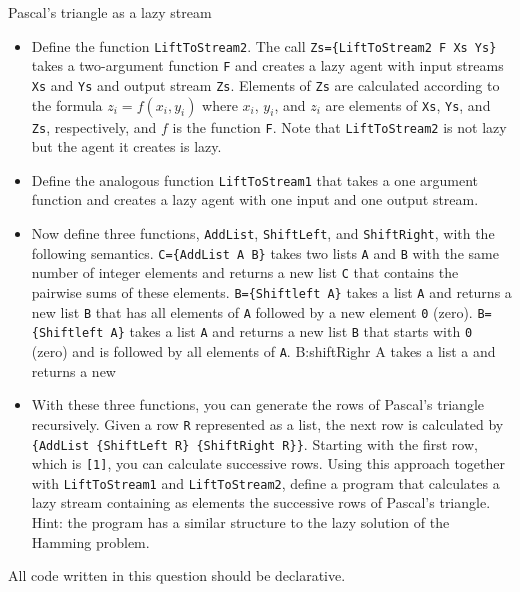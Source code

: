 
\def\date{Jan. 7, 2013}

\begin{Q1}{Pascal's triangle as a lazy stream}
 \begin{itemize}
   \item Define the function \lstinline|LiftToStream2|.
     The call \lstinline|Zs={LiftToStream2 F Xs Ys}| takes a
     two-argument function \lstinline|F| and creates a lazy agent with input
     streams \lstinline|Xs| and \lstinline|Ys| and output stream \lstinline|Zs|.
     Elements of \lstinline|Zs| are calculated according to the formula
     $z_i = f(x_i,y_i)$ where $x_i$, $y_i$, and $z_i$ are elements of
     \lstinline|Xs|, \lstinline|Ys|, and \lstinline|Zs|, respectively,
     and $f$ is the function \lstinline|F|.
     Note that \lstinline|LiftToStream2| is not lazy but the agent it creates is lazy.
   \item Define the analogous function \lstinline|LiftToStream1| that takes a one argument
     function and creates a lazy agent with one input and one output stream.
   \item Now define three functions, \lstinline|AddList|, \lstinline|ShiftLeft|,
     and \lstinline|ShiftRight|, with the following semantics.
     \lstinline|C={AddList A B}| takes two lists \lstinline|A| and \lstinline|B|
     with the same number of integer elements and returns a new list \lstinline|C|
     that contains the pairwise sums of these elements.
     \lstinline|B={Shiftleft A}| takes a list \lstinline|A| and returns a new list
     \lstinline|B| that has all elements of \lstinline|A| followed by a new element \lstinline|0| (zero).
     \lstinline|B={Shiftleft A}| takes a list \lstinline|A| and returns a new list
     \lstinline|B| that starts with \lstinline|0| (zero) and is followed by all elements of \lstinline|A|.
     B:{shiftRighr A} takes a list a and returns a new
   \item With these three functions, you can generate the rows of Pascal's triangle recursively. Given
     a row \lstinline|R| represented as a list, the next row is calculated by
     \lstinline|{AddList {ShiftLeft R} {ShiftRight R}}|.
     Starting with the first row, which is \lstinline|[1]|,
     you can calculate successive rows.
     Using this approach together with \lstinline|LiftToStream1| and \lstinline|LiftToStream2|,
     define a program that calculates a lazy stream containing as elements the successive rows of
     Pascal's triangle.
     Hint: the program has a similar structure to the lazy solution of the Hamming problem.
 \end{itemize}
  All code written in this question should be declarative.
\end{Q1}

